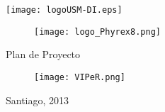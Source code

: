 \begin{titlepage} %
\thispagestyle{empty} %
\begin{center}
\texttt{[image: logoUSM-DI.eps]}
\end{center}

\begin{center} %
  {
    \begin{figure}[H]
      \centering
      \texttt{[image: logo\_Phyrex8.png]}
      \label{fig:Phyrex}
    \end{figure}
    \Huge Plan de Proyecto\\
    \begin{figure}[H]
      \centering
      \texttt{[image: VIPeR.png]}
      \label{fig:Viper}
    \end{figure}
    \normalsize Santiago, 2013
  }
\end{center}

\vspace{1cm}



\end{titlepage}
